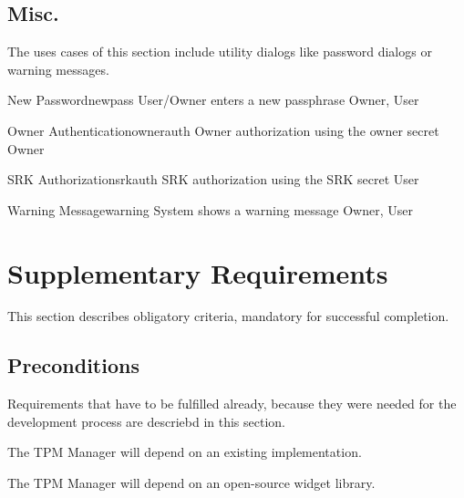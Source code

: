 \documentclass[
  american        %
]{sirrixreport}
\begin{document}
\subsection{Misc.}
The uses cases of this section include utility dialogs like password dialogs or warning messages.

\begin{usecase}{New Password}{newpass}
\ucdesc User/Owner enters a new passphrase
\ucactors  Owner, User
\end{usecase}

\begin{usecase}{Owner Authentication}{ownerauth}
\ucdesc Owner authorization using the owner secret
\ucactors  Owner
\end{usecase}

\begin{usecase}{SRK Authorization}{srkauth}
\ucdesc SRK authorization using the SRK secret
\ucactors User
\end{usecase}

\begin{usecase}{Warning Message}{warning}
\ucdesc System shows a warning message
\ucactors  Owner, User
\end{usecase}
\clearpage

\section{Supplementary Requirements}

This section describes obligatory criteria, mandatory for successful completion.

\subsection{Preconditions}


Requirements that have to be fulfilled already, because they were
 needed for the development process are descriebd in this section.

The TPM Manager will depend on an existing \TSS implementation.

The TPM Manager will depend on an open-source widget library.
\end{document}
